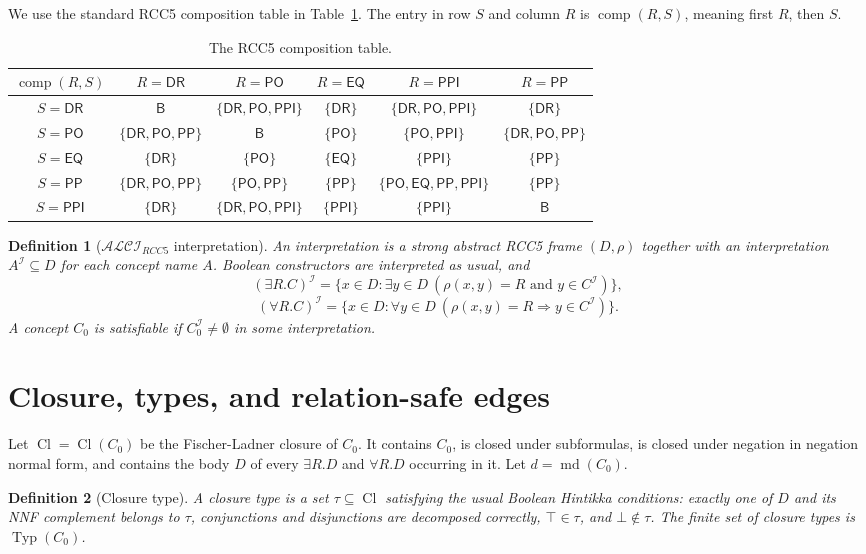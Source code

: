 \documentclass[11pt]{article}
\newtheorem{definition}{Definition}[section]
\theoremstyle{remark}
\newcommand{\Logic}{\mathcal{ALCI}_{RCC5}}
\newcommand{\Base}{\mathsf{B}}
\newcommand{\DR}{\mathsf{DR}}
\newcommand{\PO}{\mathsf{PO}}
\newcommand{\PP}{\mathsf{PP}}
\newcommand{\PPI}{\mathsf{PPI}}
\newcommand{\EQ}{\mathsf{EQ}}
\newcommand{\comp}{\operatorname{comp}}
\newcommand{\Cl}{\operatorname{Cl}}
\newcommand{\Typ}{\operatorname{Typ}}
\newcommand{\md}{\operatorname{md}}
\newcommand{\I}{\mathcal{I}}
\begin{document}
We use the standard RCC5 composition table in Table~\ref{tab:comp}.  The entry in row $S$ and column $R$ is $\comp(R,S)$, meaning first $R$, then $S$.

\begin{table}[ht]
\centering
\renewcommand{\arraystretch}{1.15}
\begin{tabular}{c|ccccc}
\toprule
$\comp(R,S)$ & $R=\DR$ & $R=\PO$ & $R=\EQ$ & $R=\PPI$ & $R=\PP$ \\
\midrule
$S=\DR$  & $\Base$ & $\{\DR,\PO,\PPI\}$ & $\{\DR\}$ & $\{\DR,\PO,\PPI\}$ & $\{\DR\}$ \\
$S=\PO$  & $\{\DR,\PO,\PP\}$ & $\Base$ & $\{\PO\}$ & $\{\PO,\PPI\}$ & $\{\DR,\PO,\PP\}$ \\
$S=\EQ$  & $\{\DR\}$ & $\{\PO\}$ & $\{\EQ\}$ & $\{\PPI\}$ & $\{\PP\}$ \\
$S=\PP$  & $\{\DR,\PO,\PP\}$ & $\{\PO,\PP\}$ & $\{\PP\}$ & $\{\PO,\EQ,\PP,\PPI\}$ & $\{\PP\}$ \\
$S=\PPI$ & $\{\DR\}$ & $\{\DR,\PO,\PPI\}$ & $\{\PPI\}$ & $\{\PPI\}$ & $\Base$ \\
\bottomrule
\end{tabular}
\caption{The RCC5 composition table.}
\label{tab:comp}
\end{table}

\begin{definition}[$\Logic$ interpretation]
An interpretation is a strong abstract RCC5 frame $(D,\rho)$ together with an interpretation $A^\I\subseteq D$ for each concept name $A$.  Boolean constructors are interpreted as usual, and
\[
(\exists R.C)^\I=\{x\in D: \exists y\in D\ (\rho(x,y)=R\text{ and }y\in C^\I)\},
\]
\[
(\forall R.C)^\I=\{x\in D: \forall y\in D\ (\rho(x,y)=R\Rightarrow y\in C^\I)\}.
\]
A concept $C_0$ is satisfiable if $C_0^\I\ne\emptyset$ in some interpretation.
\end{definition}

\section{Closure, types, and relation-safe edges}
Let $\Cl=\Cl(C_0)$ be the Fischer-Ladner closure of $C_0$.  It contains $C_0$, is closed under subformulas, is closed under negation in negation normal form, and contains the body $D$ of every $\exists R.D$ and $\forall R.D$ occurring in it.  Let $d=\md(C_0)$.

\begin{definition}[Closure type]
A closure type is a set $\tau\subseteq\Cl$ satisfying the usual Boolean Hintikka conditions: exactly one of $D$ and its NNF complement belongs to $\tau$, conjunctions and disjunctions are decomposed correctly, $\top\in\tau$, and $\bot\notin\tau$.  The finite set of closure types is $\Typ(C_0)$.
\end{definition}
\end{document}

